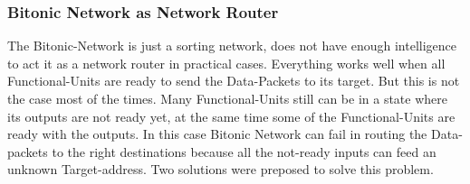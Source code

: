 \documentclass[adraft]{eptcs}
\begin{document}
			\subsubsection{Bitonic Network as Network Router}
				  The Bitonic-Network is just a sorting network, does not have enough intelligence to act it as a network router in practical cases. Everything works well when all Functional-Units 
				  are ready to send the Data-Packets to its target. But this is not the case most of the times. Many Functional-Units still can be in a state where its outputs are not ready yet,
				  at the same time some of the Functional-Units are ready with the outputs. In this case Bitonic Network can fail in routing the Data-packets to the right destinations because all
				  the not-ready inputs can feed an unknown Target-address. Two solutions were preposed to solve this problem.
\end{document}
